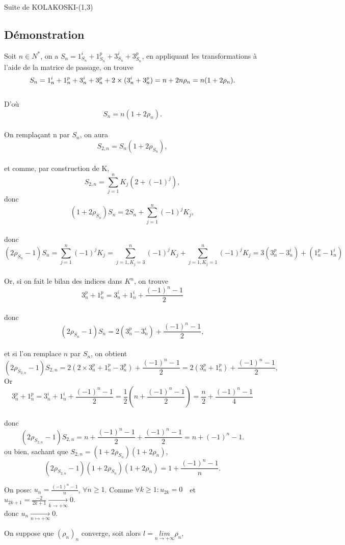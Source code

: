 \documentclass[12pt,a4paper,oneside]{book}
\begin{document}
\begin{titlepage}
\begin{chapter}{Suite de KOLAKOSKI-(1,3)}
\subsection{Démonstration}
Soit $n \in N^*$, 
on a $S_n=1_{S_n}^i+1_{S_n}^p+3_{S_n}^i+3_{S_n}^p $, 
en appliquant les transformations à l'aide de la matrice de passage, on trouve\\
 $$S_n=1_n^i+1_n^p+3_n^i+3_n^p+2 \times (3_n^i+3_n^p) \\
 =n+2n \rho_n\\ =n(1+2 \rho_n).$$ \\
D'où $$S_n=n(1+2 \rho_n).$$\\
On remplaçant n par $S_n$, on aura $$ S_{2,n}=S_n(1+2 \rho_{S_n}),$$\\
et comme, par construction de K, $$ S_{2,n}=\sum_{j=1}^n K_j(2+(-1)^j), $$ 
donc $$(1+2 \rho_{S_n})S_n= 2S_n+ \sum_{j=1}^n(-1)^jK_j,$$ \\
donc $$ 
 (2\rho_{S_n}-1)S_n =\sum_{j=1}^n(-1)^jK_j
 =\sum_{j=1,K_j=3}^n(-1)^jK_j+\sum_{j=1,K_j=1}^n(-1)^jK_j
 =3(3_n^p-3_n^i)+(1_n^p-1_n^i)
$$ \\  
Or, si on fait le bilan des indices dans $K^n$, on trouve $$ 3_n^p+1_n^p=3_n^i+1_n^i+\dfrac{(-1)^n-1}{2}$$ \\ donc 
$$(2\rho_{S_n}-1)S_n=2(3_n^p-3_n^i)+\frac{(-1)^n-1}{2},$$\\ 
et si l'on remplace $n$ par $S_n$, on obtient $$(2\rho_{S_{2,n}}-1)S_{2,n}=2(2 \times 3_n^p+1_n^p-3_n^p)+ \frac{(-1)^n-1}{2}=2(3_n^p+1_n^p)+\frac{(-1)^n-1}{2},$$
Or $$3_n^p+1_n^p=3_n^i+1_n^i+\frac{(-1)^n-1}{2}=\frac{1}{2}(n+\frac{(-1)^n-1}{2})=\frac{n}{2}+\frac{(-1)^n-1}{4}$$\\ 
donc $$(2\rho_S_{2,n}-1)S_{2,n}=n+\frac{(-1)^n-1}{2}+\frac{(-1)^n-1}{2}=n+(-1)^n-1.$$ 
ou bien, sachant que $S_{2,n}=(1+2\rho_{S_n})(1+2\rho_n),$
\begin{equation}
(2 \rho_{S_{2,n}}-1)(1+2\rho_{S_n})(1+2\rho_n)=1+\frac{(-1)^n-1}{n}.\end{equation}
\par On pose: $u_n= \frac{(-1)^n-1}{n}$, $\forall n \geq 1$. Comme $\forall k \geq 1: u_{2k}=0$ \,\ et \,\ $ u_{2k+1}=\frac{-2}{2k+1}\underset{k\rightarrow + \infty}{\longrightarrow} 0$.\\
 donc $ u_n\underset{n \longmapsto + \infty}{\longrightarrow} 0$.\\
\par On suppose que $(\rho_n)_n$ converge, soit alors $l=\underset{n\rightarrow + \infty}{l i m}\rho_n$, \\

\end{chapter}
\end{titlepage}
\end{document}
